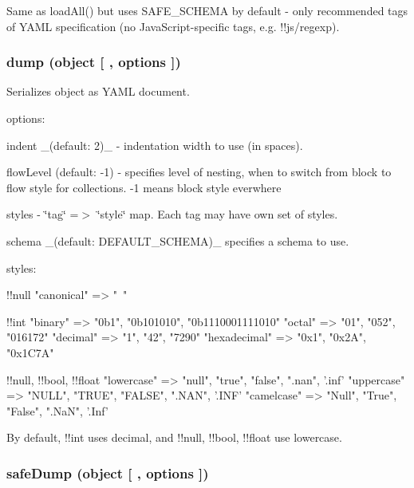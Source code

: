 Same as {\ttfamily load\+All()} but uses {\ttfamily S\+A\+F\+E\+\_\+\+S\+C\+H\+E\+MA} by default -\/ only recommended tags of Y\+A\+ML specification (no Java\+Script-\/specific tags, e.\+g. {\ttfamily !!js/regexp}).

\subsubsection*{dump (object \mbox{[} , options \mbox{]})}

Serializes {\ttfamily object} as Y\+A\+ML document.

options\+:


\begin{DoxyItemize}
\item {\ttfamily indent} \+\_\+(default\+: 2)\+\_\+ -\/ indentation width to use (in spaces).
\item {\ttfamily flow\+Level} (default\+: -\/1) -\/ specifies level of nesting, when to switch from block to flow style for collections. -\/1 means block style everwhere
\item {\ttfamily styles} -\/ \char`\"{}tag\char`\"{} =$>$ \char`\"{}style\char`\"{} map. Each tag may have own set of styles.
\item {\ttfamily schema} \+\_\+(default\+: {\ttfamily D\+E\+F\+A\+U\+L\+T\+\_\+\+S\+C\+H\+E\+MA})\+\_\+ specifies a schema to use.
\end{DoxyItemize}

styles\+:


\begin{DoxyCode}
!!null
  "canonical"   => "~"

!!int
  "binary"      => "0b1", "0b101010", "0b1110001111010"
  "octal"       => "01", "052", "016172"
  "decimal"     => "1", "42", "7290"
  "hexadecimal" => "0x1", "0x2A", "0x1C7A"

!!null, !!bool, !!float
  "lowercase"   => "null", "true", "false", ".nan", '.inf'
  "uppercase"   => "NULL", "TRUE", "FALSE", ".NAN", '.INF'
  "camelcase"   => "Null", "True", "False", ".NaN", '.Inf'
\end{DoxyCode}


By default, !!int uses {\ttfamily decimal}, and !!null, !!bool, !!float use {\ttfamily lowercase}.

\subsubsection*{safe\+Dump (object \mbox{[} , options \mbox{]})}

